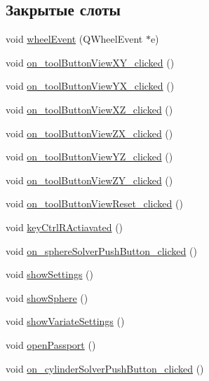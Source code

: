 \subsection*{Закрытые слоты}
\begin{DoxyCompactItemize}
\item 
void \mbox{\hyperlink{class_main_window_ad2a20182d1ed20479debef57417cdb05}{wheel\+Event}} (Q\+Wheel\+Event $\ast$e)
\item 
void \mbox{\hyperlink{class_main_window_a8f31a3e693f087eb17c8ea48e4e2ee74}{on\+\_\+tool\+Button\+View\+X\+Y\+\_\+clicked}} ()
\item 
void \mbox{\hyperlink{class_main_window_ab5efeaaaa1154e1fdbcb0bfa5f6ff5fe}{on\+\_\+tool\+Button\+View\+Y\+X\+\_\+clicked}} ()
\item 
void \mbox{\hyperlink{class_main_window_a3f9c5595b9d72fcd58d5b1057d74a171}{on\+\_\+tool\+Button\+View\+X\+Z\+\_\+clicked}} ()
\item 
void \mbox{\hyperlink{class_main_window_a3538288359ae2ef76fc50bf8b11f2514}{on\+\_\+tool\+Button\+View\+Z\+X\+\_\+clicked}} ()
\item 
void \mbox{\hyperlink{class_main_window_ab3b376113fdc5caa38811cfdbb93481e}{on\+\_\+tool\+Button\+View\+Y\+Z\+\_\+clicked}} ()
\item 
void \mbox{\hyperlink{class_main_window_af156b1f58ddafe013d2a8249a22138b6}{on\+\_\+tool\+Button\+View\+Z\+Y\+\_\+clicked}} ()
\item 
void \mbox{\hyperlink{class_main_window_a43dfd48c91d2615d08460baad8d5699d}{on\+\_\+tool\+Button\+View\+Reset\+\_\+clicked}} ()
\item 
void \mbox{\hyperlink{class_main_window_a73c60b914a2a815b17925c105f4e518c}{key\+Ctrl\+R\+Actiavated}} ()
\item 
void \mbox{\hyperlink{class_main_window_a5bfa72b752825f4f46f59cc3f74558f0}{on\+\_\+sphere\+Solver\+Push\+Button\+\_\+clicked}} ()
\item 
void \mbox{\hyperlink{class_main_window_aabfa36b35a25cafc7832c489f5bd30f2}{show\+Settings}} ()
\item 
void \mbox{\hyperlink{class_main_window_a6414efba29acd1d6075897fea544fb86}{show\+Sphere}} ()
\item 
void \mbox{\hyperlink{class_main_window_a02a28badd46c03cba3e765da92296be0}{show\+Variate\+Settings}} ()
\item 
void \mbox{\hyperlink{class_main_window_aa4e061d83c32ac0cd51d12091bd5ce39}{open\+Passport}} ()
\item 
void \mbox{\hyperlink{class_main_window_ae7c0fbd49598e38f87c58b1e8e8eeb03}{on\+\_\+cylinder\+Solver\+Push\+Button\+\_\+clicked}} ()

\end{DoxyCompactItemize}
